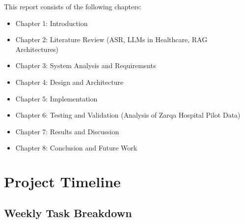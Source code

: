 This report consists of the following chapters:

\begin{itemize}
    \item Chapter 1: Introduction
    \item Chapter 2: Literature Review (ASR, LLMs in Healthcare, RAG Architectures)
    \item Chapter 3: System Analysis and Requirements
    \item Chapter 4: Design and Architecture
    \item Chapter 5: Implementation
    \item Chapter 6: Testing and Validation (Analysis of Zarqa Hospital Pilot Data)
    \item Chapter 7: Results and Discussion
    \item Chapter 8: Conclusion and Future Work
\end{itemize}

\section{Project Timeline}\label{sec:intro:timeline}

\subsection*{Weekly Task Breakdown}

